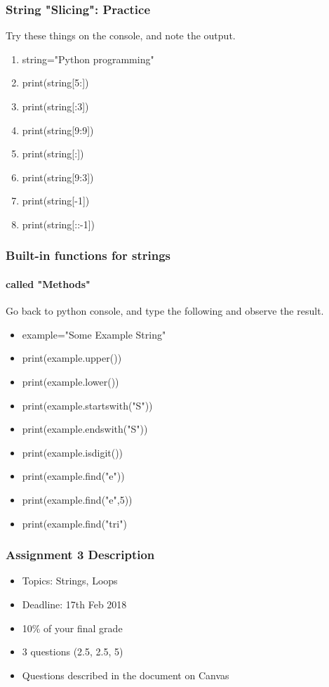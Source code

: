 \documentclass{beamer}
\begin{document}
\begin{frame}
\frametitle{String "Slicing": Practice}
Try these things on the console, and note the output.
\begin{enumerate}
\item string="Python programming"
\item print(string[5:])
\item print(string[:3])
\item print(string[9:9])
\item print(string[:])
\item print(string[9:3])
\item print(string[-1])
\item print(string[::-1])
\end{enumerate}
\end{frame}

\begin{frame} %
\frametitle{Built-in functions for strings}
\framesubtitle{called "Methods"}
Go back to python console, and type the following and observe the result.
\begin{itemize}
\item example="Some Example String"
\item print(example.upper())
\item print(example.lower())
\item print(example.startswith("S"))
\item print(example.endswith("S"))
\item print(example.isdigit())
\item print(example.find("e"))
\item print(example.find("e",5))
\item print(example.find("tri")
\end{itemize}
\end{frame}


\begin{frame}
\frametitle{Assignment 3 Description}
\begin{itemize}
\item Topics: Strings, Loops
\item Deadline: 17th Feb 2018
\item 10\% of your final grade
\item 3 questions (2.5, 2.5, 5)
\item Questions described in the document on Canvas
\end{itemize}
\end{frame}
\end{document}
